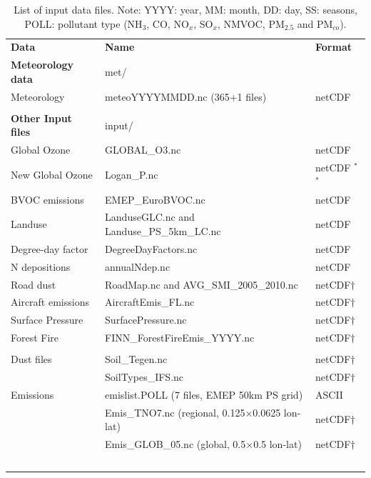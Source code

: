 \documentclass[a4paper,12pt]{report}
\begin{document}
\begin{table}
\caption[List of input data files]{List of input data files.
Note: YYYY: year, MM: month, DD: day, SS: seasons, POLL: pollutant
type (NH$_3$, CO, NO$_x$, SO$_x$, NMVOC,
PM$_{2.5}$ and PM$_{co}$). 
\label{Tab:inputdata}}
\begin{center}
\begin{small}
\begin{tabular}{lll}
\hline
{\bf Data} &  {\bf Name} & {\bf Format}\\
{\bf Meteorology data} & met/&  \\
Meteorology  &  meteoYYYYMMDD.nc \quad (365+1 files) & netCDF\\
& & \\
{\bf Other Input files} & input/ &\\
Global Ozone & GLOBAL\_O3.nc & netCDF\\
New Global Ozone & Logan\_P.nc & netCDF $^*$$^*$\\
BVOC emissions & EMEP\_EuroBVOC.nc & netCDF\\
Landuse & LanduseGLC.nc and Landuse\_PS\_5km\_LC.nc  & netCDF\\
Degree-day factor & DegreeDayFactors.nc &  netCDF\\
N depositions & annualNdep.nc  & netCDF\\
Road dust &  RoadMap.nc and AVG\_SMI\_2005\_2010.nc& netCDF$\dagger$ \\
Aircraft emissions & AircraftEmis\_FL.nc & netCDF$\dagger$ \\
Surface Pressure & SurfacePressure.nc & netCDF$\dagger$ \\
Forest Fire & FINN\_ForestFireEmis\_YYYY.nc & netCDF$\dagger$ \\
& & \\
Dust files  &Soil\_Tegen.nc  & netCDF$\dagger$\\
 & SoilTypes\_IFS.nc & netCDF$\dagger$\\
Emissions & emislist.POLL  \quad ({\footnotesize 7 files, EMEP 50km PS grid}) & ASCII\\
 & Emis\_TNO7.nc \quad ({\footnotesize regional, 0.125$\times$0.0625 lon-lat})& netCDF$\dagger$\\
 & Emis\_GLOB\_05.nc \quad ({\footnotesize global, 0.5$\times$0.5 lon-lat})& netCDF$\dagger$\\
$$
\end{tabular}
\end{small}
\end{center}
\end{table}
\end{document}

